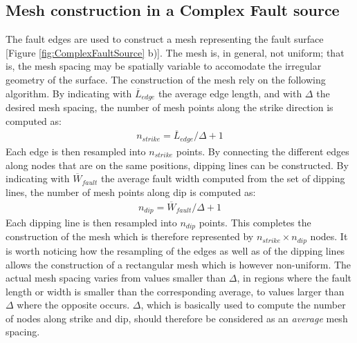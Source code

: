 \subsection{Mesh construction in a Complex Fault source}
The fault edges are used to construct a mesh representing the fault surface 
[Figure \ref{fig:ComplexFaultSource} b)]. The mesh is, in general, not uniform; that is,
the mesh spacing may be spatially variable to accomodate the irregular geometry of the surface.
The construction of the mesh rely on the following algorithm. By indicating with
$\overline{L}_{edge}$ the average edge length, and with $\Delta$
the desired mesh spacing, the number of mesh points along the strike direction is computed as:
\begin{align}
n_{strike} = \overline{L}_{edge} / \Delta + 1
\end{align}
Each edge is then resampled into $n_{strike}$ points. By connecting the different edges along
nodes that are on the same positions, dipping lines can be constructed. By indicating with
$\overline{W}_{fault}$ the average fault width computed from the set of dipping lines, the
number of mesh points along dip is computed as:
\begin{align}
n_{dip} = \overline{W}_{fault}/  \Delta + 1
\end{align}
Each dipping line is then resampled into $n_{dip}$ points. This completes the construction of
the mesh which is therefore represented by $n_{strike} \times n_{dip}$ nodes. It is worth noticing
how the resampling of the edges as well as of the dipping lines allows the construction of a rectangular
mesh which is however non-uniform. The actual mesh spacing varies from values smaller than $\Delta$,
in regions where the fault length or width is smaller than the corresponding average, to values larger than
$\Delta$ where the opposite occurs. $\Delta$, which is basically used to compute the number of nodes along
strike and dip, should therefore be considered as an \textit{average} mesh spacing.

